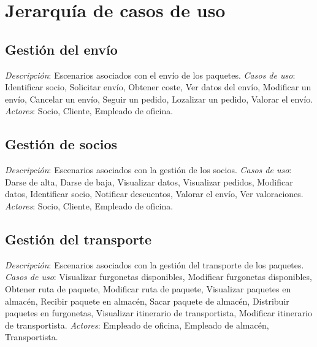 \section{Jerarquía de casos de uso}
\subsection{Gestión del envío}	
\textit{Descripción}: \newline
Escenarios asociados con el envío de los paquetes. \newline
\textit{Casos de uso}: \newline
 Identificar socio, Solicitar envío, Obtener coste, Ver datos del envío, Modificar un envío, Cancelar un envío, Seguir un pedido, Lozalizar un pedido, Valorar el envío. \newline
\textit{Actores}: \newline
Socio, Cliente, Empleado de oficina.
\subsection{Gestión de socios}	
\textit{Descripción}: \newline
Escenarios asociados con la gestión de los socios. \newline
\textit{Casos de uso}: \newline
 Darse de alta, Darse de baja, Visualizar datos, Visualizar pedidos, Modificar datos, Identificar socio, Notificar descuentos, Valorar el envío, Ver valoraciones. \newline
\textit{Actores}: \newline
Socio, Cliente, Empleado de oficina.
\subsection{Gestión del transporte}	
\textit{Descripción}: \newline
Escenarios asociados con la gestión del transporte de los paquetes. \newline
\textit{Casos de uso}: \newline
Visualizar furgonetas disponibles, Modificar furgonetas disponibles, Obtener ruta de paquete, Modificar ruta de paquete, Visualizar paquetes en almacén, Recibir paquete en almacén, Sacar paquete de almacén, Distribuir paquetes en furgonetas, Visualizar itinerario de transportista, Modificar itinerario de transportista. \newline
\textit{Actores}: \newline
Empleado de oficina, Empleado de almacén, Transportista.

